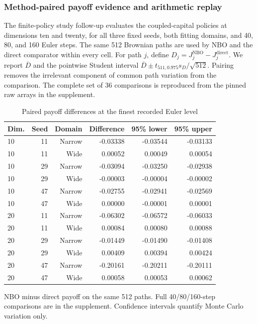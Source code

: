 \documentclass[ecta,nameyear,draft]{econsocart}
\theoremstyle{definition}
\theoremstyle{remark}
\begin{document}
\subsubsection{Method-paired payoff evidence and arithmetic replay}\label{sec:r8-coverage}
The finite-policy study follow-up evaluates the coupled-capital policies at dimensions ten and twenty, for all three fixed seeds, both fitting domains, and 40, 80, and 160 Euler steps. The same 512 Brownian paths are used by NBO and the direct comparator within every cell. For path $j$, define $D_j=J_j^{\mathrm{NBO}}-J_j^{\mathrm{direct}}$. We report $\overline D$ and the pointwise Student interval $\overline D\pm t_{511,0.975}s_D/\sqrt{512}$. Pairing removes the irrelevant component of common path variation from the comparison. The complete set of 36 comparisons is reproduced from the pinned raw arrays in the supplement.

\begin{table}[htbp]\centering
\caption{Paired payoff differences at the finest recorded Euler level}
\begin{small}\begin{tabular}{lrrrrr}
\toprule
Dim. & Seed & Domain & Difference & 95\% lower & 95\% upper \\
\midrule
10 & 11 & Narrow & -0.03338 & -0.03544 & -0.03133 \\
10 & 11 & Wide & 0.00052 & 0.00049 & 0.00054 \\
10 & 29 & Narrow & -0.03094 & -0.03250 & -0.02938 \\
10 & 29 & Wide & -0.00003 & -0.00004 & -0.00002 \\
10 & 47 & Narrow & -0.02755 & -0.02941 & -0.02569 \\
10 & 47 & Wide & 0.00000 & -0.00001 & 0.00001 \\
20 & 11 & Narrow & -0.06302 & -0.06572 & -0.06033 \\
20 & 11 & Wide & 0.00084 & 0.00080 & 0.00088 \\
20 & 29 & Narrow & -0.01449 & -0.01490 & -0.01408 \\
20 & 29 & Wide & 0.00409 & 0.00394 & 0.00424 \\
20 & 47 & Narrow & -0.20161 & -0.20211 & -0.20111 \\
20 & 47 & Wide & 0.00058 & 0.00053 & 0.00062 \\
\bottomrule\end{tabular}\end{small}
\par\smallskip\begin{minipage}{0.96\linewidth}\footnotesize NBO minus direct payoff on the same 512 paths. Full 40/80/160-step comparisons are in the supplement. Confidence intervals quantify Monte Carlo variation only.\end{minipage}
\end{table}
\end{document}
